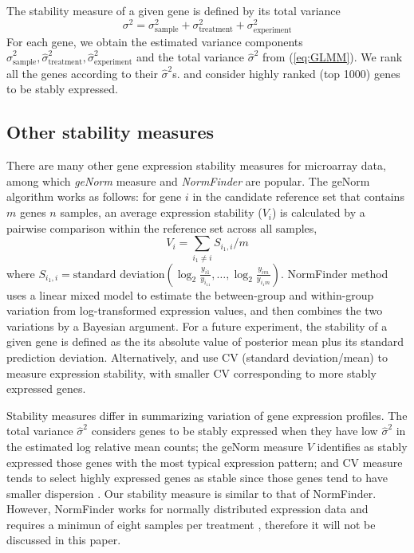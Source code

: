 \documentclass[11pt, a4paper]{article}
\begin{document}
The stability measure of a given gene is defined by its total variance
 \begin{equation}\label{eq:totalVariance}
 \sigma^2 =\sigma_{\text{sample}}^2+ \sigma_{\text{treatment}}^2+ \sigma_{\text{experiment}}^2
 \end{equation}
For each gene, we obtain the estimated variance components $\hat\sigma_{\text{sample}}^2,  \hat\sigma_{\text{treatment}}^2,  \hat\sigma_{\text{experiment}}^2$ and the total variance $\hat\sigma^2$ from (\ref{eq:GLMM}).
We rank all the genes according to their $\hat\sigma^2$s. and consider highly ranked (top 1000) genes to be stably expressed. 

\subsection{Other stability measures}\label{subsection:OtherStabilityMeasure}
There are many other gene expression stability measures for microarray data, among which \textit{geNorm} measure \citep{vandesompele2002accurate} and \textit{NormFinder} \citep{andersen2004normalization} are popular. The geNorm algorithm works as follows: for gene $i$ in the candidate reference set that contains $m$ genes $n$ samples, an average expression stability ($V_i$) is calculated by a pairwise comparison within the reference set across all samples, 
\begin{equation}\label{eq:vvalue}
V_i = \sum_{i_1 \neq i}S_{i_1, i}/m
\end{equation}
 where $S_{i_1, i} = \text{standard deviation}(\log_2 \frac{y_{i1}}{y_{i_11}}, \ldots, \log_2 \frac{y_{im}}{y_{i_1m}})$. NormFinder method uses a linear mixed model to estimate the between-group and within-group variation from log-transformed expression values, and then combines the two variations by a Bayesian argument. For a future experiment, the stability of a given gene is defined as the its absolute value of posterior mean plus its standard prediction deviation. Alternatively, \cite{czechowski2005genome} and \cite{dekkers2012identification} use CV (standard deviation/mean) to measure expression stability, with smaller CV  corresponding to more stably expressed genes.
	
Stability measures differ in summarizing variation of gene expression profiles. The total variance $\hat{\sigma}^2$ considers genes to be stably expressed when they have low $\hat{\sigma}^2$ in the estimated log relative mean
counts; the geNorm measure $V$ identifies as stably
expressed those genes with the most typical expression pattern; and CV measure
\citep{czechowski2005genome} tends to select highly expressed genes as stable
since those genes tend to have smaller dispersion \citep{hruz2011refgenes}. Our stability measure is similar to that of NormFinder. However, NormFinder works for normally distributed expression data and requires a minimun of eight samples per treatment \citep{andersen2004normalization}, therefore it will not be discussed in this paper. %
\end{document}
